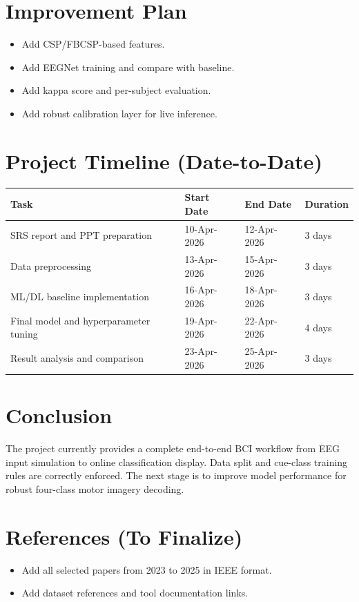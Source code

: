 \documentclass[12pt,a4paper]{article}
\begin{document}
\section{Improvement Plan}
\begin{itemize}[leftmargin=1.5em]
  \item Add CSP/FBCSP-based features.
  \item Add EEGNet training and compare with baseline.
  \item Add kappa score and per-subject evaluation.
  \item Add robust calibration layer for live inference.
\end{itemize}

\section{Project Timeline (Date-to-Date)}
\begin{longtable}{p{}p{}p{}p{}}
\toprule
\textbf{Task} & \textbf{Start Date} & \textbf{End Date} & \textbf{Duration} \\
\midrule
SRS report and PPT preparation & 10-Apr-2026 & 12-Apr-2026 & 3 days \\
Data preprocessing & 13-Apr-2026 & 15-Apr-2026 & 3 days \\
ML/DL baseline implementation & 16-Apr-2026 & 18-Apr-2026 & 3 days \\
Final model and hyperparameter tuning & 19-Apr-2026 & 22-Apr-2026 & 4 days \\
Result analysis and comparison & 23-Apr-2026 & 25-Apr-2026 & 3 days \\
\bottomrule
\end{longtable}

\section{Conclusion}
The project currently provides a complete end-to-end BCI workflow from EEG input simulation to online classification display. Data split and cue-class training rules are correctly enforced. The next stage is to improve model performance for robust four-class motor imagery decoding.

\section{References (To Finalize)}
\begin{itemize}[leftmargin=1.5em]
  \item Add all selected papers from 2023 to 2025 in IEEE format.
  \item Add dataset references and tool documentation links.
\end{itemize}
\end{document}
